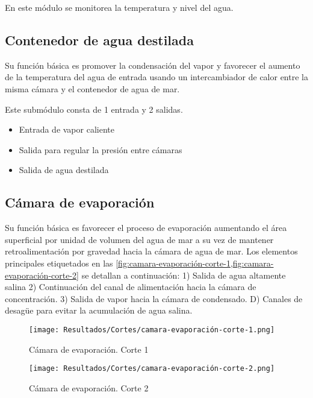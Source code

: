 			En este módulo se monitorea la temperatura y nivel del agua.
		
		\subsection{Contenedor de agua destilada}
			
			Su función básica es promover la condensación del vapor y favorecer el aumento de la temperatura del agua de entrada usando un intercambiador de calor entre la misma cámara y el contenedor de agua de mar.
			
			Este submódulo consta de 1 entrada y 2 salidas.
			
			\begin{itemize}[columns=2]
				\item Entrada de vapor caliente \columnbreak
				\item Salida para regular la presión entre cámaras
				\item Salida de agua destilada
			\end{itemize}
		
						
		\subsection{Cámara de evaporación}
			
			Su función básica es favorecer el proceso de evaporación aumentando el área superficial por unidad de volumen del agua de mar a su vez de mantener retroalimentación por gravedad hacia la cámara de agua de mar. Los elementos principales etiquetados en las \cref{fig:camara-evaporación-corte-1,fig:camara-evaporación-corte-2} se detallan a continuación: 1) Salida de agua altamente salina 2) Continuación del canal de alimentación hacia la cámara de concentración. 3) Salida de vapor hacia la cámara de condensado. D) Canales de desagüe para evitar la acumulación de agua salina.
		
			\begin{figure}[H]
				\centering
				\texttt{[image: Resultados/Cortes/camara-evaporación-corte-1.png]}
				\caption{Cámara de evaporación. Corte 1}
				\label{fig:camara-evaporación-corte-1}
			\end{figure}
			
			\begin{figure}[H]
				\centering
				\texttt{[image: Resultados/Cortes/camara-evaporación-corte-2.png]}
				\caption{Cámara de evaporación. Corte 2}
				\label{fig:camara-evaporación-corte-2}
			\end{figure}
			
